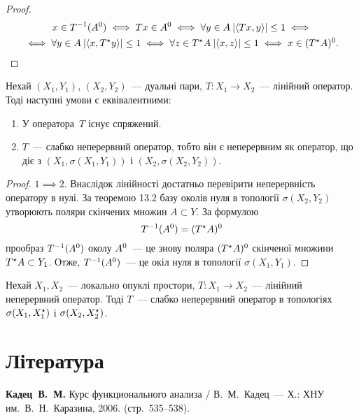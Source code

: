 \begin{proof}
    \begin{multline*}
        x \in T^{-1}(A^0) \iff T x \in A^0 \iff \forall y \in A \: |\langle T x, y\rangle| \le 1 \iff \\
        \iff \forall y \in A \: |\langle x, T^\star y\rangle| \le 1 \iff \forall z \in T^\star A \: |\langle x, z\rangle| \le 1 \iff x \in (T^\star A)^0. \qedhere
    \end{multline*}
\end{proof}

\begin{theorem}
    Нехай $(X_1, Y_1)$, $(X_2, Y_2)$~--- дуальні пари, $T: X_1 \to X_2$~--- лінійний оператор. Тоді наступні умови є еквівалентними:
    \begin{enumerate}
        \item У оператора~$T$ існує спряжений.
        \item $T$~--- слабко неперервний оператор, тобто він є неперервним як оператор, що діє з $(X_1, \sigma(X_1, Y_1))$ і $(X_2, \sigma(X_2, Y_2))$.
    \end{enumerate}
\end{theorem}

\begin{proof}
    $1 \implies 2$. Внаслідок лінійності достатньо перевірити неперервність оператору в нулі. За теоремою 13.2 базу околів нуля в топології $\sigma(X_2, Y_2)$ утворюють поляри скінчених множин $A \subset Y$. За формулою
    \begin{equation*}
        T^{-1}(A^0) = (T^\star A)^0
    \end{equation*}
    прообраз $T^{-1}(A^0)$ околу $A^0$~--- це знову поляра $(T^\star A)^0$ скінченої множини $T^\star A \subset Y_1$. Отже, $T^{-1}(A^0)$~--- це окіл нуля в топології $\sigma(X_1, Y_1)$.
\end{proof}

\begin{corollary}
    Нехай $X_1, X_2$~--- локально опуклі простори, $T: X_1 \to X_2$~--- лінійний неперервний оператор. Тоді $T$~--- слабко неперервний оператор в топологіях $\sigma(X_1, X^\star_1)$ і $\sigma(X_2, X^\star_2)$.
\end{corollary}

\section{Література}

\begin{enumerate}[label={[\arabic*]}]
\item \textbf{Кадец~В.~М.}
Курс функционального анализа /
В.~М.~Кадец~---
Х.: ХНУ им.~В.~Н.~Каразина, 2006. (стр.~535--538).
\end{enumerate}
